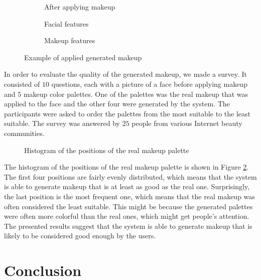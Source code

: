 \documentclass[conference]{IEEEtran}
\begin{document}
\begin{figure}
\begin{subfigure}{0.49\linewidth}
        \caption{After applying makeup}
    \end{subfigure}
    \par\vspace{0.5\baselineskip}
    \begin{subfigure}{0.49\linewidth}
        \centering 
        \caption{Facial features}
    \end{subfigure}
    \hfill
    \begin{subfigure}{0.49\linewidth}
        \centering 
        \caption{Makeup features}
    \end{subfigure}
  \caption{Example of applied generated makeup}
  \label{fig:example}
\end{figure}

In order to evaluate the quality of the generated makeup, we made a survey.
It consisted of $10$ questions, each with a picture of a face before applying makeup and $5$ makeup color palettes.
One of the palettes was the real makeup that was applied to the face and the other four were generated by the system.
The participants were asked to order the palettes from the most suitable to the least suitable.
The survey was answered by $25$ people from various Internet beauty communities.

\begin{figure}
    \vspace{0.1\baselineskip}
    \centering 
    \vspace{0.1\baselineskip}
    \caption{Histogram of the positions of the real makeup palette}
    \label{fig:survey}
\end{figure}

The histogram of the positions of the real makeup palette is shown in Figure \ref{fig:survey}.
The first four positions are fairly evenly distributed, which means that the system is able to generate makeup that is at least as good as the real one.
Surprisingly, the last position is the most frequent one, which means that the real makeup was often considered the least suitable.
This might be because the generated palettes were often more colorful than the real ones, which might get people's attention.
The presented results suggest that the system is able to generate makeup that is likely to be considered good enough by the users.

\section{Conclusion} \label{sec:conclusion}
\end{document}
